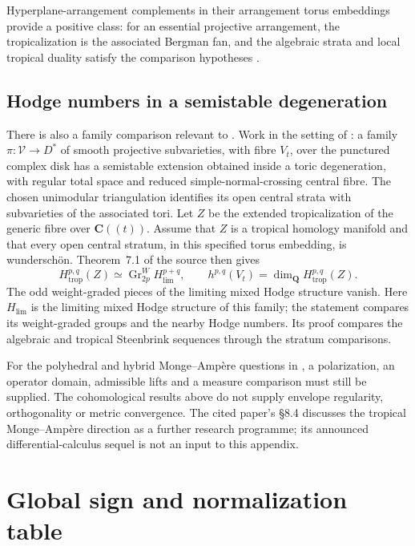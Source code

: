 Hyperplane-arrangement complements in their arrangement torus embeddings
provide a positive class: for an essential projective arrangement, the
tropicalization is the associated Bergman fan, and the algebraic
strata and local tropical duality satisfy the comparison hypotheses
\cite[\S8.2]{AAPS25Cohomologically}.

\subsection{Hodge numbers in a semistable degeneration}

There is also a family comparison relevant to
. Work in the setting of
\cite[\S7]{AAPS25Cohomologically}: a family
$\pi:\mathcal V\to D^*$ of smooth projective subvarieties, with fibre
$V_t$, over the punctured complex disk has a semistable extension
obtained inside a toric degeneration, with regular total space and reduced
simple-normal-crossing central fibre. The chosen unimodular triangulation
identifies its open central strata with subvarieties of the associated
tori. Let $Z$ be the extended tropicalization of the generic fibre over
$\mathbf C((t))$. Assume that $Z$ is a tropical homology manifold and
that every open central stratum, in this specified torus embedding, is
wundersch\"on. Theorem~7.1 of the source then gives
\[
 H^{p,q}_{\mathrm{trop}}(Z)
       \simeq\operatorname{Gr}^{W}_{2p}H^{p+q}_{\lim},
 \qquad
 h^{p,q}(V_t)=\dim_{\mathbf Q}H^{p,q}_{\mathrm{trop}}(Z).
\]
The odd weight-graded pieces of the limiting mixed Hodge structure
vanish. Here $H_{\lim}$ is the limiting mixed Hodge structure of this
family; the statement compares its weight-graded groups and the nearby
Hodge numbers. Its proof compares the algebraic and tropical Steenbrink
sequences through the stratum comparisons.

For the polyhedral and hybrid Monge--Amp\`ere questions in
, a
polarization, an operator domain, admissible lifts and a measure comparison
must still be supplied. The cohomological results above do not supply
envelope regularity, orthogonality or metric convergence. The cited
paper's \S8.4 discusses the tropical Monge--Amp\`ere direction as a
further research programme; its announced differential-calculus sequel
is not an input to this appendix.

\section{Global sign and normalization table}
\label{sec:appG-sign-table}

